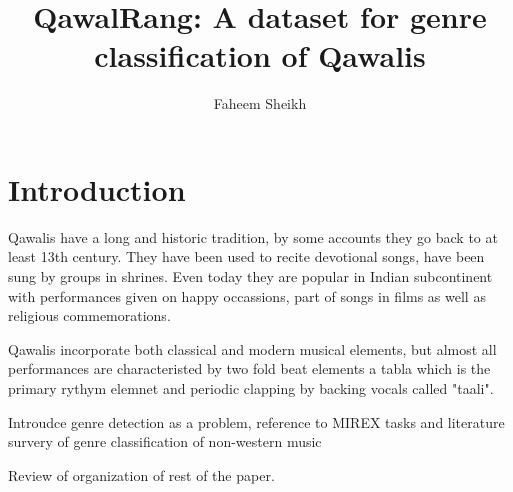 \documentclass{article}
\title{QawalRang: A dataset for genre classification of Qawalis}
\author{%
Faheem Sheikh}%
\date{}
\begin{document}

\saythanks{}


\section{Introduction}\label{sec:intro}
Qawalis have a long and historic tradition, by some accounts they go back to at least 13th century. They have been used to recite devotional songs, have been sung by groups in shrines. Even today they are popular in Indian subcontinent with performances given on happy occassions, part of songs  in films as well as religious commemorations. 

Qawalis incorporate both classical and modern musical elements, but almost all performances are characteristed by two fold beat elements a tabla which is the primary rythym elemnet and periodic clapping by backing vocals called "taali".

Introudce genre detection as a problem, reference to MIREX tasks and literature survery of genre classification of non-western music

Review of organization of rest of the paper.
\end{document}
